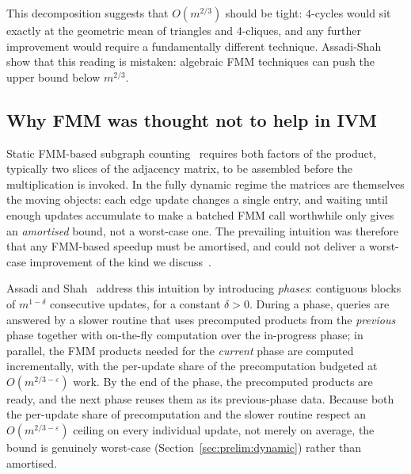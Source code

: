 \documentclass[sigconf,nonacm]{acmart}
\theoremstyle{plain}
\theoremstyle{definition}
\begin{document}
This decomposition suggests that $O(m^{2/3})$ should be tight:
$4$-cycles would sit exactly at the geometric mean of triangles
and $4$-cliques, and any further improvement would require a
fundamentally different technique. Assadi-Shah~\cite{AssadiShah25}
show that this reading is mistaken: algebraic FMM techniques can
push the upper bound below $m^{2/3}$.

\subsection{Why FMM was thought not to help in IVM}
\label{sec:related:fmm-belief}
Static FMM-based subgraph counting~\cite{AYZ97} requires both factors
of the product, typically two slices of the adjacency matrix, to
be assembled before the multiplication is invoked. In the fully
dynamic regime the matrices are themselves the moving objects: each
edge update changes a single entry, and waiting until enough updates
accumulate to make a batched FMM call worthwhile only gives an
\emph{amortised} bound, not a worst-case one. The
prevailing intuition was therefore that any FMM-based speedup must
be amortised, and could not deliver a worst-case improvement of the
kind we discuss~\cite[\S1]{AssadiShah25}.

Assadi and Shah~\cite{AssadiShah25} address this intuition by
introducing \emph{phases}: contiguous blocks of $m^{1-\delta}$
consecutive updates, for a constant $\delta > 0$. During a phase,
queries are answered by a slower routine that uses precomputed
products from the \emph{previous} phase together with on-the-fly
computation over the in-progress phase; in parallel, the FMM
products needed for the \emph{current} phase are computed
incrementally, with the per-update share of the precomputation
budgeted at $O(m^{2/3-\varepsilon})$ work. By the end of the phase,
the precomputed products are ready, and the next phase reuses them
as its previous-phase data. Because both the per-update share of
precomputation and the slower routine respect an
$O(m^{2/3-\varepsilon})$ ceiling on every individual update, not
merely on average, the bound is genuinely worst-case
(Section~\ref{sec:prelim:dynamic}) rather than amortised.
\end{document}
